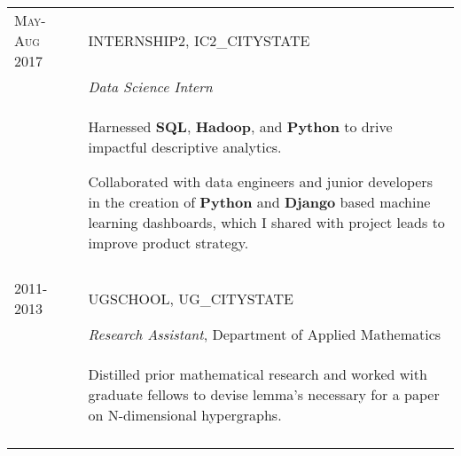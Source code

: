 \documentclass[a4paper,10pt]{article}
\begin{document}
\begin{supertabular}{l p{0.55cm} p{13.9cm}}
	\textsc{May-Aug 2017}	&& \textsc{INTERNSHIP2}, IC2_CITYSTATE \\
												&& \small	\emph{Data Science Intern} \\
												&& \begin{enumerate*}[label =$\circ$, itemjoin={\newline}]
														\item \footnotesize Harnessed $\mathbf{SQL}$, $\mathbf{Hadoop}$, and $\mathbf{Python}$ to drive impactful descriptive analytics.
														\item \footnotesize Collaborated with data engineers and junior developers in the creation of $\mathbf{Python}$ and $\mathbf{Django}$ based machine learning dashboards, which I shared with project leads to improve product strategy. \end{enumerate*} \\
	 \\
	


	\textsc{2011-2013}		&& \textsc{UGSCHOOL}, UG_CITYSTATE \\
	\textsc{}							&& \small	\emph{Research Assistant}, Department of Applied Mathematics \\
												&& \begin{enumerate*}[label =$\circ$, itemjoin={\newline}]
														\item \footnotesize Distilled prior mathematical research and worked with graduate fellows to devise lemma's necessary for a paper on N-dimensional hypergraphs. 
														\end{enumerate*} \\
	 \\


\end{supertabular}





\end{document}

